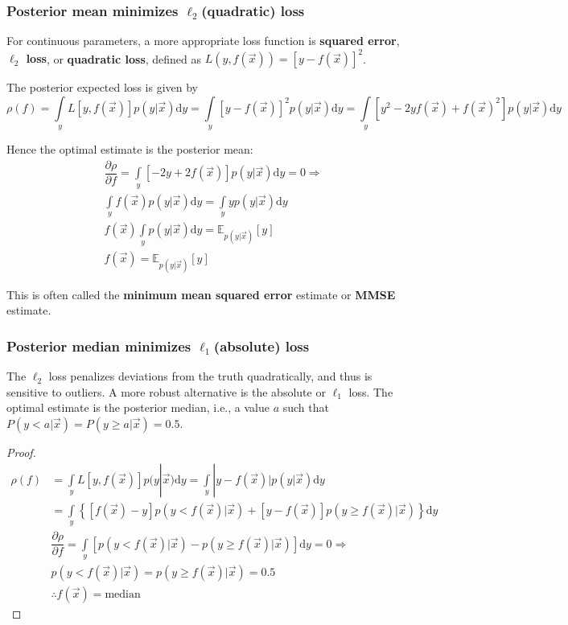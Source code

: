\subsubsection{Posterior mean minimizes	$\ell_2$(quadratic) loss}
For continuous parameters, a more appropriate loss function is \textbf{squared error}, \textbf{$\ell_2$ loss}, or \textbf{quadratic loss}, defined as $L(y,f(\vec{x}))=\left[y-f(\vec{x})\right]^2$.

The posterior expected loss is given by
\begin{equation}
\rho(f)=\int\limits_y L[y,f(\vec{x})]p(y|\vec{x})\mathrm{d}y=\int\limits_y \left[y-f(\vec{x})\right]^2p(y|\vec{x})\mathrm{d}y=\int\limits_y \left[y^2-2yf(\vec{x})+f(\vec{x})^2\right]p(y|\vec{x})\mathrm{d}y
\end{equation}

Hence the optimal estimate is the posterior mean:
\begin{align}
& \dfrac{\partial \rho}{\partial f} =\int\limits_y [-2y+2f(\vec{x})]p(y|\vec{x})\mathrm{d}y=0 \Rightarrow \nonumber \\
& \int\limits_y f(\vec{x})p(y|\vec{x})\mathrm{d}y = \int\limits_y yp(y|\vec{x})\mathrm{d}y \nonumber \\
& f(\vec{x}) \int\limits_y p(y|\vec{x})\mathrm{d}y = \mathbb{E}_{p(y|\vec{x})}[y] \nonumber \\
& f(\vec{x}) = \mathbb{E}_{p(y|\vec{x})}[y]
\end{align}

This is often called the \textbf{minimum mean squared error} estimate or \textbf{MMSE} estimate.


\subsubsection{Posterior median minimizes $\ell_1$(absolute) loss}
The $\ell_2$ loss penalizes deviations from the truth quadratically, and thus is sensitive to outliers. A more robust alternative is the absolute or $\ell_1$ loss. The optimal estimate is the posterior median, i.e., a value $a$ such that $P(y<a|\vec{x})=P(y \geq a|\vec{x})=0.5$.

\begin{proof}
\begin{align*}
\rho(f)& =\int\limits_y L[y,f(\vec{x})]p(y|\vec{x})\mathrm{d}y=\int\limits_y |y-f(\vec{x})|p(y|\vec{x})\mathrm{d}y \\
       & =\int\limits_y \left\{[f(\vec{x})-y]p(y<f(\vec{x})|\vec{x})+[y-f(\vec{x})]p(y \geq f(\vec{x})|\vec{x})\right\}\mathrm{d}y \\
& \dfrac{\partial \rho}{\partial f}=\int\limits_y \left[p(y<f(\vec{x})|\vec{x})-p(y \geq f(\vec{x})|\vec{x})\right]\mathrm{d}y=0 \Rightarrow \\
& p(y<f(\vec{x})|\vec{x})=p(y \geq f(\vec{x})|\vec{x})=0.5 \\
& \therefore f(\vec{x})=\text{median}
\end{align*}
\end{proof}


